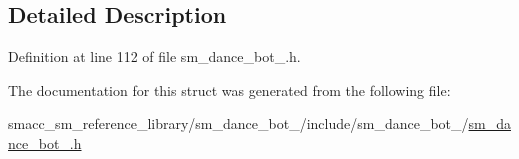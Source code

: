 \subsection{Detailed Description}


Definition at line 112 of file sm\+\_\+dance\+\_\+bot\+\_.\+h.



The documentation for this struct was generated from the following file\+:\begin{DoxyCompactItemize}
\item 
smacc\+\_\+sm\+\_\+reference\+\_\+library/sm\+\_\+dance\+\_\+bot\+\_/include/sm\+\_\+dance\+\_\+bot\+\_/\hyperlink{sm__dance__bot__3_8h}{sm\+\_\+dance\+\_\+bot\+\_.\+h}\end{DoxyCompactItemize}
